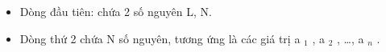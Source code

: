\begin{itemize}
	\item     Dòng đầu tiên: chứa 2 số nguyên L, N.   
	\item     Dòng thứ 2 chứa N số nguyên, tương ứng là các giá trị a    $_     1    $    , a    $_     2    $    , …, a    $_     n    $    .   
\end{itemize}